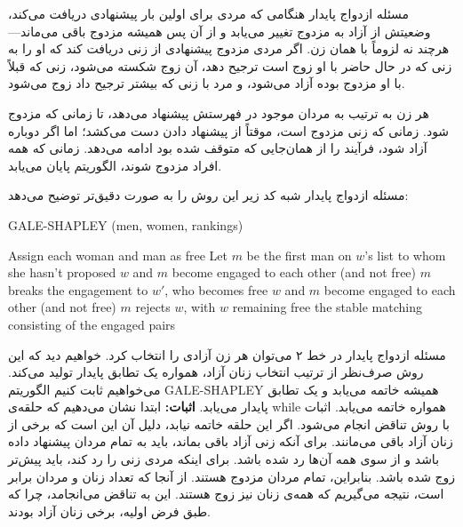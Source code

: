 \begin{itemframe}{مسئله ازدواج پایدار}
\itm
هنگامی که مردی برای اولین بار پیشنهادی دریافت می‌کند، وضعیتش از آزاد به مزدوج تغییر می‌یابد و از آن پس همیشه مزدوج باقی می‌ماند—هرچند نه لزوماً با همان زن.
\itm
 اگر مردی مزدوج پیشنهادی از زنی دریافت کند که او را به زنی که در حال حاضر با او زوج است ترجیح دهد، آن زوج شکسته می‌شود، زنی که قبلاً با او مزدوج بوده آزاد می‌شود، و مرد با زنی که بیشتر ترجیح داد زوج می‌شود.

\itm
هر زن به ترتیب به مردان موجود در فهرستش پیشنهاد می‌دهد، تا زمانی که مزدوج شود. زمانی که زنی مزدوج است، موقتاً از پیشنهاد دادن دست می‌کشد؛ اما اگر دوباره آزاد شود، فرآیند را از همان‌جایی که متوقف شده بود ادامه می‌دهد.
\itm
زمانی که همه افراد مزدوج شوند، الگوریتم پایان می‌یابد.
\end{itemframe}

\begin{itemframe}{مسئله ازدواج پایدار}
\itm
شبه کد زیر این روش را به صورت دقیق‌تر توضیح می‌دهد:
\begin{algorithm}[H]\alglr
\caption{GALE-SHAPLEY (men, women, rankings)}
\begin{algorithmic}[1]
\State Assign each woman and man as free
    \State Let $m$ be the first man on $w$’s list to whom she hasn't proposed
        \State $w$ and $m$ become engaged to each other (and not free)
        \State $m$ breaks the engagement to $w'$, who becomes free
        \State $w$ and $m$ become engaged to each other (and not free)
    \Else
        \State $m$ rejects $w$, with $w$ remaining free
    \EndIf
\EndWhile
\State \Return the stable matching consisting of the engaged pairs
\end{algorithmic}
\end{algorithm}

\end{itemframe}

\begin{itemframe}{مسئله ازدواج پایدار}
\itm
در خط ۲ می‌توان هر زن آزادی را انتخاب کرد. خواهیم دید که این روش صرف‌نظر از ترتیب انتخاب زنان آزاد، همواره یک تطابق پایدار تولید می‌کند.
\itm
‌می‌خواهیم ثابت کنیم الگوریتم GALE-SHAPLEY همیشه خاتمه می‌یابد و یک تطابق پایدار می‌یابد.
\itm
\textbf{اثبات:}
 ابتدا نشان می‌دهیم که حلقه‌ی while همواره خاتمه می‌یابد. اثبات با روش تناقض انجام می‌شود. اگر این حلقه خاتمه نیابد، دلیل آن این است که برخی از زنان آزاد باقی می‌مانند. برای آنکه زنی آزاد باقی بماند، باید به تمام مردان پیشنهاد داده باشد و از سوی همه آن‌ها رد شده باشد.
\itm
 برای اینکه مردی زنی را رد کند، باید پیش‌تر زوج شده باشد. بنابراین، تمام مردان مزدوج هستند. از آنجا که تعداد زنان و مردان برابر است، نتیجه می‌گیریم که همه‌ی زنان نیز زوج هستند. این به تناقض می‌انجامد، چرا که طبق فرض اولیه، برخی زنان آزاد بودند.
\end{itemframe}

